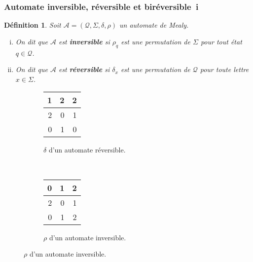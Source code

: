 \documentclass[11pt]{beamer}
\newtheorem{defi}{Définition}
\begin{document}
\begin{frame}
  \frametitle{Automate inversible, réversible et biréversible~i}

  \begin{defi}
    Soit $\mathcal{A}=\left(\mathcal{Q}, \Sigma, \delta, \rho\right)$ un automate de Mealy.
    \begin{enumerate}[(i)]
    \item On dit que $\mathcal{A}$ est \textbf{inversible} si $\rho_q$ est une permutation de $\Sigma$ pour tout état $q\in\mathcal{Q}$.
    \item On dit que $\mathcal{A}$ est \textbf{réversible} si $\delta_x$ est une permutation de $\mathcal{Q}$ pour toute lettre $x\in\Sigma$.
    \end{enumerate}
  \end{defi}

  \begin{figure}[!ht]
    \begin{subfigure}[b]{0.4\textwidth}
      \centering
      \begin{tabular}{|r|r|r|}
        \hline
        1 & 2 & 2 \\
        \hline
        2 & 0 & 1 \\
        \hline
        0 & 1 & 0 \\
        \hline
      \end{tabular}
      \caption{$\delta$ d'un automate réversible.}
    \end{subfigure}
    ~
    \begin{subfigure}[b]{0.4\textwidth}
      \centering
      \begin{tabular}{|r|r|r|}
        \hline
        0 & 1 & 2 \\
        \hline
        2 & 0 & 1 \\
        \hline
        0 & 1 & 2 \\
        \hline
      \end{tabular}
      \caption{$\rho$ d'un automate inversible.}
    \end{subfigure}
  \end{figure}


\end{frame}
\end{document}
